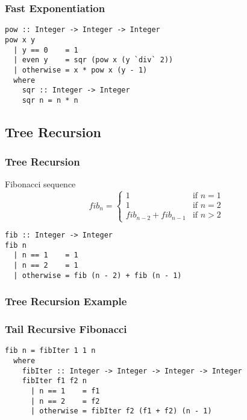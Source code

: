 \documentclass[dvipsnames]{beamer}
\theoremstyle{plain}
\begin{document}
\begin{frame}[fragile]
  \frametitle{Fast Exponentiation}

  \begin{lstlisting}
pow :: Integer -> Integer -> Integer
pow x y
  | y == 0    = 1
  | even y    = sqr (pow x (y `div` 2))
  | otherwise = x * pow x (y - 1)
  where
    sqr :: Integer -> Integer
    sqr n = n * n
  \end{lstlisting}
\end{frame}

\subsection{Tree Recursion}

\begin{frame}[fragile]
  \frametitle{Tree Recursion}

  \begin{exampleblock}{Fibonacci sequence}
    \[
      fib_n =
        \begin{cases}
          1                     & \mbox{if } n = 1\\
          1                     & \mbox{if } n = 2\\
          fib_{n-2} + fib_{n-1} & \mbox{if } n > 2
        \end{cases}
    \]

    \begin{lstlisting}
fib :: Integer -> Integer
fib n
  | n == 1    = 1
  | n == 2    = 1
  | otherwise = fib (n - 2) + fib (n - 1)
    \end{lstlisting}
  \end{exampleblock}
\end{frame}

\begin{frame}[fragile]
  \frametitle{Tree Recursion Example}

  \begin{center}
  \end{center}
\end{frame}

\begin{frame}[fragile]
  \frametitle{Tail Recursive Fibonacci}

  \begin{exampleblock}{}
    \begin{lstlisting}
fib n = fibIter 1 1 n
  where
    fibIter :: Integer -> Integer -> Integer -> Integer
    fibIter f1 f2 n
      | n == 1    = f1
      | n == 2    = f2
      | otherwise = fibIter f2 (f1 + f2) (n - 1)
    \end{lstlisting}
  \end{exampleblock}
\end{frame}
\end{document}
